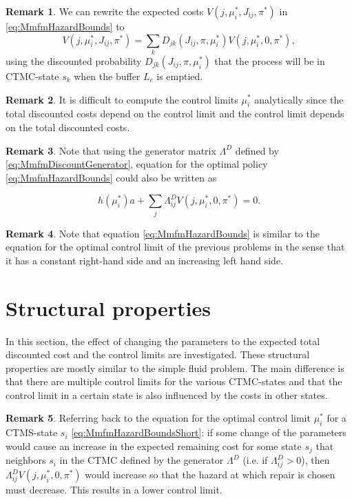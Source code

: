 \documentclass[a4paper]{thesis}
\theoremstyle{definition}
\newtheorem{remark}{Remark}[chapter]
\begin{document}
\begin{remark}
	We can rewrite the expected costs $V(j,\mu_i^*,J_{ij},\pi^*)$ in \eqref{eq:MmfmHazardBounds} to
	\[
	V(j,\mu_i^*,J_{ij},\pi^*)=\sum\limits_k D_{jk}(J_{ij},\pi,\mu_i^*)V(j,\mu_i^*,0,\pi^*),
	\]
	using the discounted probability $D_{jk}(J_{ij},\pi,\mu_i^*)$ that the process will be in CTMC-state $s_k$ when the buffer $L_c$ is emptied.
\end{remark}

\begin{remark}
	It is difficult to compute the control limits $\mu_i^*$ analytically since the total discounted costs depend on the control limit and the control limit depends on the total discounted costs.
\end{remark}

\begin{remark}
Note that using the generator matrix $\Lambda^D$ defined by \eqref{eq:MmfmDiscountGenerator}, equation for the optimal policy \eqref{eq:MmfmHazardBounds} could also be written as

\begin{equation}\label{eq:MmfmHazardBoundsShort}
h(\mu_i^*)a+\sum\limits_j\Lambda^D_{ij}V(j,\mu_i^*,0,\pi^*)=0.
\end{equation}
\end{remark}

\begin{remark}
Note that equation \eqref{eq:MmfmHazardBounds} is similar to the equation for the optimal control limit of the previous problems in the sense that it has a constant right-hand side and an increasing left hand side.
\end{remark} \section{Structural properties}
In this section, the effect of changing the parameters to the expected total discounted cost and the control limits are investigated.
These structural properties are mostly similar to the simple fluid problem.
The main difference is that there are multiple control limits for the various CTMC-states and that the control limit in a certain state is also influenced by the costs in other states.

\begin{remark}
	Referring back to the equation for the optimal control limit $\mu_i^*$ for a CTMS-state $s_i$ \eqref{eq:MmfmHazardBoundsShort}: if some change of the parameters would cause an increase in the expected remaining cost for some state $s_j$ that neighbors $s_i$ in the CTMC defined by the generator $\Lambda^D$ (i.e. if $\Lambda^D_{ij}>0$), then $\Lambda^D_{ij}V(j,\mu_i^*,0,\pi^*)$ would increase so that the hazard at which repair is chosen must decrease.
	This results in a lower control limit.
\end{remark}
\end{document}
